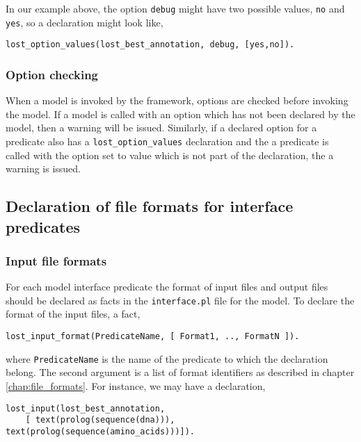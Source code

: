 \documentclass{book}
\begin{document}
In our example above, the option \texttt{debug} might have two
possible values, \texttt{no} and \texttt{yes}, so a declaration might
look like, 
\begin{verbatim}
lost_option_values(lost_best_annotation, debug, [yes,no]).
\end{verbatim}

\subsubsection{Option checking}

When a model is invoked by the framework, options are checked before 
invoking the model. If a model is called with an option which has not
been declared by the model, then a warning will be issued. Similarly, 
if a declared option for a predicate also has a
\texttt{lost\_option\_values} declaration and the a predicate is called
with the option set to value which is not part of the declaration, the a warning is issued. 

\subsection{Declaration of file formats for interface predicates}


\subsubsection{Input file formats}

For each model interface predicate the format of input files and
output files should be declared as facts in the \texttt{interface.pl} file for the model.
To declare the format of the input files, a fact, 

\begin{verbatim}
lost_input_format(PredicateName, [ Format1, .., FormatN ]).
\end{verbatim}

\noindent
where \texttt{PredicateName} is the name of the predicate to which 
the declaration belong. The second argument is a list of format 
identifiers as described in chapter \ref{chap:file_formats}.
For instance, we may have a declaration,
\begin{verbatim}
lost_input(lost_best_annotation, 
    [ text(prolog(sequence(dna))), text(prolog(sequence(amino_acids)))]).
\end{verbatim}
\end{document}
